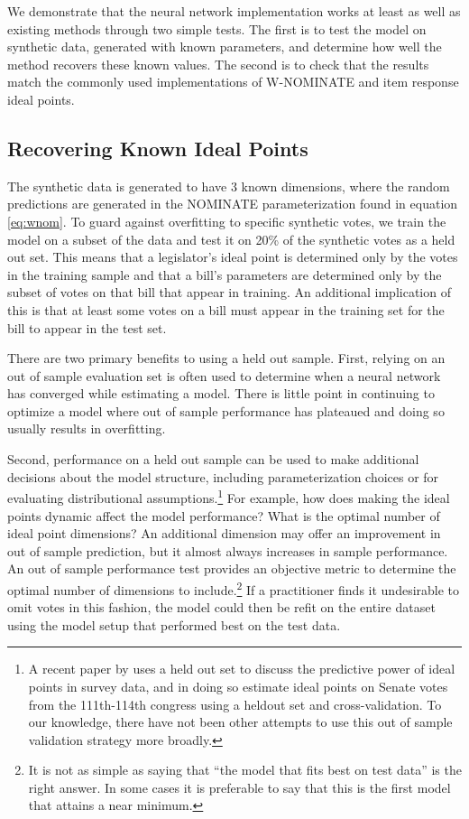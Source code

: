 \documentclass[11pt,]{article}
\begin{document}
We demonstrate that the neural network implementation works at least as
well as existing methods through two simple tests. The first is to test
the model on synthetic data, generated with known parameters, and
determine how well the method recovers these known values. The second is
to check that the results match the commonly used implementations of
W-NOMINATE \citep{wnominate} and item response \citep{pscl} ideal
points.

\subsection{Recovering Known Ideal
Points}\label{recovering-known-ideal-points}

The synthetic data is generated to have 3 known dimensions, where the
random predictions are generated in the NOMINATE parameterization found
in equation \ref{eq:wnom}. To guard against overfitting to specific
synthetic votes, we train the model on a subset of the data and test it
on 20\% of the synthetic votes as a held out set. This means that a
legislator's ideal point is determined only by the votes in the training
sample and that a bill's parameters are determined only by the subset of
votes on that bill that appear in training. An additional implication of
this is that at least some votes on a bill must appear in the training
set for the bill to appear in the test set.

There are two primary benefits to using a held out sample. First,
relying on an out of sample evaluation set is often used to determine
when a neural network has converged while estimating a model. There is
little point in continuing to optimize a model where out of sample
performance has plateaued and doing so usually results in overfitting.

Second, performance on a held out sample can be used to make additional
decisions about the model structure, including parameterization choices
or for evaluating distributional assumptions.\footnote{A recent paper by
  \cite{marble2017much} uses a held out set to discuss the predictive
  power of ideal points in survey data, and in doing so estimate ideal
  points on Senate votes from the 111th-114th congress using a heldout
  set and cross-validation. To our knowledge, there have not been other
  attempts to use this out of sample validation strategy more broadly.}
For example, how does making the ideal points dynamic affect the model
performance? What is the optimal number of ideal point dimensions? An
additional dimension may offer an improvement in out of sample
prediction, but it almost always increases in sample performance. An out
of sample performance test provides an objective metric to determine the
optimal number of dimensions to include.\footnote{It is not as simple as
  saying that ``the model that fits best on test data'' is the right
  answer. In some cases it is preferable to say that this is the first
  model that attains a near minimum.} If a practitioner finds it
undesirable to omit votes in this fashion, the model could then be refit
on the entire dataset using the model setup that performed best on the
test data.
\end{document}
